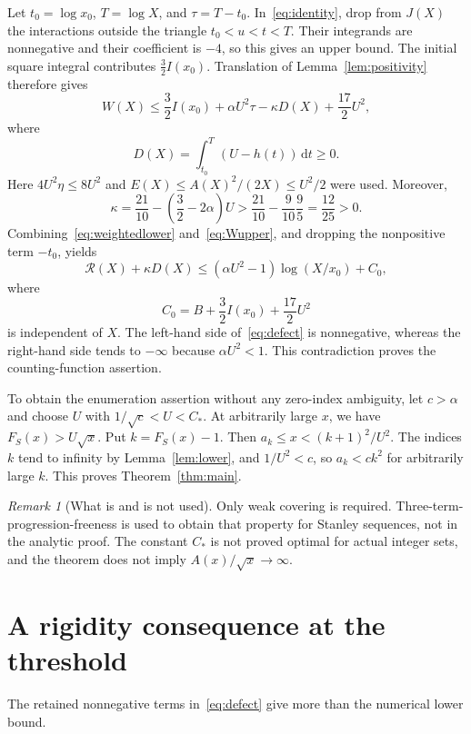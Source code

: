 \documentclass[11pt]{article}
\theoremstyle{definition}\newtheorem{definition}[theorem]{Definition}
\theoremstyle{remark}\newtheorem{remark}[theorem]{Remark}
\numberwithin{equation}{section}
\newcommand{\al}{\alpha}
\newcommand{\Cs}{C_*}
\newcommand{\RR}{\mathcal R}
\newcommand{\dd}{\,\mathrm d}
\begin{document}
Let $t_0=\log x_0$, $T=\log X$, and $\tau=T-t_0$. In~\eqref{eq:identity}, drop from $J(X)$ the interactions outside the triangle $t_0<u<t<T$. Their integrands are nonnegative and their coefficient is $-4$, so this gives an upper bound. The initial square integral contributes $\frac32 I(x_0)$. Translation of Lemma~\ref{lem:positivity} therefore gives
\begin{equation}\label{eq:Wupper}
W(X)\le\frac32 I(x_0)+\al U^2\tau-\kappa D(X)+\frac{17}{2}U^2,
\end{equation}
where
\[
D(X)=\int_{t_0}^T(U-h(t))\dd t\ge0.
\]
Here $4U^2\eta\le8U^2$ and $E(X)\le A(X)^2/(2X)\le U^2/2$ were used. Moreover,
\begin{equation}\label{eq:kappa}
\kappa=\frac{21}{10}-\left(\frac32-2\al\right)U
>\frac{21}{10}-\frac9{10}\frac95=\frac{12}{25}>0.
\end{equation}
Combining~\eqref{eq:weightedlower} and~\eqref{eq:Wupper}, and dropping the nonpositive term $-t_0$, yields
\begin{equation}\label{eq:defect}
\boxed{\RR(X)+\kappa D(X)
\le(\al U^2-1)\log(X/x_0)+C_0,}
\end{equation}
where
\[
C_0=B+\frac32 I(x_0)+\frac{17}{2}U^2
\]
is independent of $X$. The left-hand side of~\eqref{eq:defect} is nonnegative, whereas the right-hand side tends to $-\infty$ because $\al U^2<1$. This contradiction proves the counting-function assertion.

To obtain the enumeration assertion without any zero-index ambiguity, let $c>\al$ and choose $U$ with $1/\sqrt c<U<\Cs$. At arbitrarily large $x$, we have $F_S(x)>U\sqrt x$. Put $k=F_S(x)-1$. Then $a_k\le x<(k+1)^2/U^2$. The indices $k$ tend to infinity by Lemma~\ref{lem:lower}, and $1/U^2<c$, so $a_k<ck^2$ for arbitrarily large $k$. This proves Theorem~\ref{thm:main}.

\begin{remark}[What is and is not used]
Only weak covering is required. Three-term-progression-freeness is used to obtain that property for Stanley sequences, not in the analytic proof. The constant $\Cs$ is not proved optimal for actual integer sets, and the theorem does not imply $A(x)/\sqrt x\to\infty$.
\end{remark}

\section{A rigidity consequence at the threshold}\label{sec:rigidity}
The retained nonnegative terms in~\eqref{eq:defect} give more than the numerical lower bound.
\end{document}

